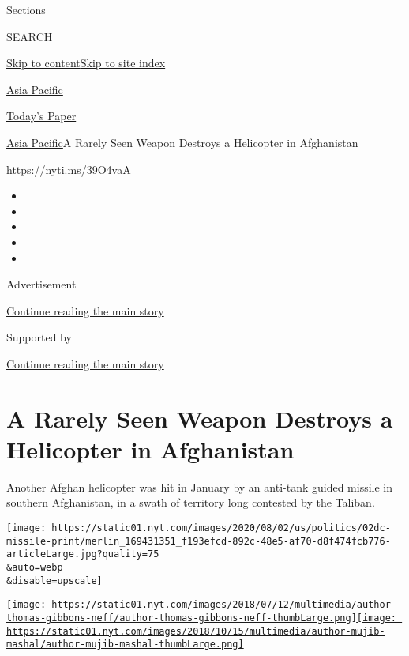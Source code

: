 Sections

SEARCH

\protect\hyperlink{site-content}{Skip to
content}\protect\hyperlink{site-index}{Skip to site index}

\href{https://www.nytimes.com/section/world/asia}{Asia Pacific}

\href{https://myaccount.nytimes.com/auth/login?response_type=cookie\&client_id=vi}{}

\href{https://www.nytimes.com/section/todayspaper}{Today's Paper}

\href{/section/world/asia}{Asia Pacific}\textbar{}A Rarely Seen Weapon
Destroys a Helicopter in Afghanistan

\url{https://nyti.ms/39O4vaA}

\begin{itemize}
\item
\item
\item
\item
\item
\end{itemize}

Advertisement

\protect\hyperlink{after-top}{Continue reading the main story}

Supported by

\protect\hyperlink{after-sponsor}{Continue reading the main story}

\hypertarget{a-rarely-seen-weapon-destroys-a-helicopter-in-afghanistan}{%
\section{A Rarely Seen Weapon Destroys a Helicopter in
Afghanistan}\label{a-rarely-seen-weapon-destroys-a-helicopter-in-afghanistan}}

Another Afghan helicopter was hit in January by an anti-tank guided
missile in southern Afghanistan, in a swath of territory long contested
by the Taliban.

\texttt{[image: https://static01.nyt.com/images/2020/08/02/us/politics/02dc-missile-print/merlin\_169431351\_f193efcd-892c-48e5-af70-d8f474fcb776-articleLarge.jpg?quality=75\\\&auto=webp\\\&disable=upscale]}

\href{https://www.nytimes.com/by/thomas-gibbons-neff}{\texttt{[image: https://static01.nyt.com/images/2018/07/12/multimedia/author-thomas-gibbons-neff/author-thomas-gibbons-neff-thumbLarge.png]}}\href{https://www.nytimes.com/by/mujib-mashal}{\texttt{[image: https://static01.nyt.com/images/2018/10/15/multimedia/author-mujib-mashal/author-mujib-mashal-thumbLarge.png]}}

